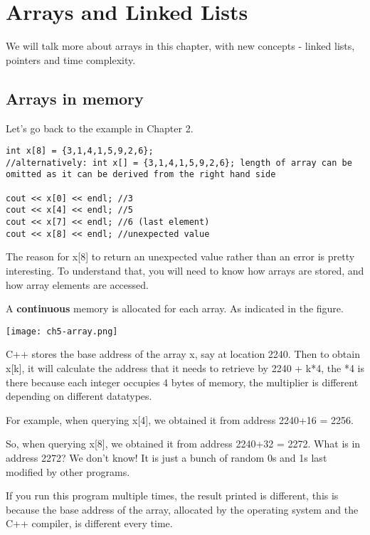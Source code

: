 \chapter{Arrays and Linked Lists}

We will talk more about arrays in this chapter, with new concepts - linked lists, pointers and time complexity.

\section{Arrays in memory}

Let's go back to the example in Chapter 2.

\begin{lstlisting}
int x[8] = {3,1,4,1,5,9,2,6};
//alternatively: int x[] = {3,1,4,1,5,9,2,6}; length of array can be omitted as it can be derived from the right hand side

cout << x[0] << endl; //3 
cout << x[4] << endl; //5
cout << x[7] << endl; //6 (last element)
cout << x[8] << endl; //unexpected value 
\end{lstlisting}

The reason for x[8] to return an unexpected value rather than an error is pretty interesting. To understand that, you will need to know how arrays are stored, and how array elements are accessed. 

A \textbf{continuous} memory is allocated for each array. As indicated in the figure.

\texttt{[image: ch5-array.png]}

C++ stores the base address of the array x, say at location 2240. Then to obtain x[k], it will calculate the address that it needs to retrieve by 2240 + k*4, the *4 is there because each integer occupies 4 bytes of memory, the multiplier is different depending on different datatypes. 

For example, when querying x[4], we obtained it from address 2240+16 = 2256. 

So, when querying x[8], we obtained it from address 2240+32 = 2272. What is in address 2272? We don't know! It is just a bunch of random 0s and 1s last modified by other programs. 
\vspace{6mm}

If you run this program multiple times, the result printed is different, this is because the base address of the array, allocated by the operating system and the C++ compiler, is different every time. 

